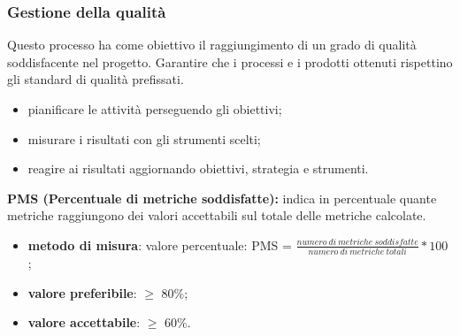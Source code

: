 \subsubsection{Gestione della qualità}
Questo processo ha come obiettivo il raggiungimento di un grado di qualità soddisfacente nel progetto.
Garantire che i processi e i prodotti ottenuti rispettino gli standard di qualità prefissati.
\begin{itemize}
    \item pianificare le attività perseguendo gli obiettivi;
    \item misurare i risultati con gli strumenti scelti;
    \item reagire ai risultati aggiornando obiettivi, strategia e strumenti.
\end{itemize}
\textbf{PMS (Percentuale di metriche soddisfatte):} indica in percentuale quante metriche raggiungono dei valori accettabili sul totale delle metriche calcolate.
\begin{itemize}
    \item \textbf{metodo di misura}: valore percentuale: PMS = $\frac{numero \ di \ metriche \ soddisfatte}{numero \ di \ metriche \ totali} * 100$ ;
    \item \textbf{valore preferibile}: $\geq$ 80\%;
    \item \textbf{valore accettabile}: $\geq$ 60\%.
\end{itemize}
\newpage





